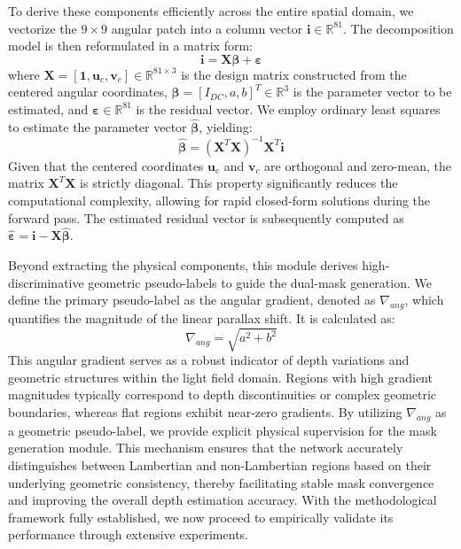 To derive these components efficiently across the entire spatial domain, we vectorize the $9 \times 9$ angular patch into a column vector $\mathbf{i} \in \mathbb{R}^{81}$. The decomposition model is then reformulated in a matrix form:
\begin{equation}
\label{eq:eq10}
\mathbf{i} = \mathbf{X} \boldsymbol{\beta} + \boldsymbol{\varepsilon}
\end{equation}
where $\mathbf{X} = [\mathbf{1}, \mathbf{u}_c, \mathbf{v}_c] \in \mathbb{R}^{81 \times 3}$ is the design matrix constructed from the centered angular coordinates, $\boldsymbol{\beta} = [I_{DC}, a, b]^T \in \mathbb{R}^{3}$ is the parameter vector to be estimated, and $\boldsymbol{\varepsilon} \in \mathbb{R}^{81}$ is the residual vector. We employ ordinary least squares to estimate the parameter vector $\hat{\boldsymbol{\beta}}$, yielding:
\begin{equation}
\label{eq:eq11}
\hat{\boldsymbol{\beta}} = (\mathbf{X}^T \mathbf{X})^{-1} \mathbf{X}^T \mathbf{i}
\end{equation}
Given that the centered coordinates $\mathbf{u}_c$ and $\mathbf{v}_c$ are orthogonal and zero-mean, the matrix $\mathbf{X}^T \mathbf{X}$ is strictly diagonal. This property significantly reduces the computational complexity, allowing for rapid closed-form solutions during the forward pass. The estimated residual vector is subsequently computed as $\hat{\boldsymbol{\varepsilon}} = \mathbf{i} - \mathbf{X} \hat{\boldsymbol{\beta}}$.

Beyond extracting the physical components, this module derives high-discriminative geometric pseudo-labels to guide the dual-mask generation. We define the primary pseudo-label as the angular gradient, denoted as $\nabla_{ang}$, which quantifies the magnitude of the linear parallax shift. It is calculated as:
\begin{equation}
\label{eq:eq12}
\nabla_{ang} = \sqrt{a^2 + b^2}
\end{equation}
This angular gradient serves as a robust indicator of depth variations and geometric structures within the light field domain. Regions with high gradient magnitudes typically correspond to depth discontinuities or complex geometric boundaries, whereas flat regions exhibit near-zero gradients. By utilizing $\nabla_{ang}$ as a geometric pseudo-label, we provide explicit physical supervision for the mask generation module. This mechanism ensures that the network accurately distinguishes between Lambertian and non-Lambertian regions based on their underlying geometric consistency, thereby facilitating stable mask convergence and improving the overall depth estimation accuracy. With the methodological framework fully established, we now proceed to empirically validate its performance through extensive experiments.
